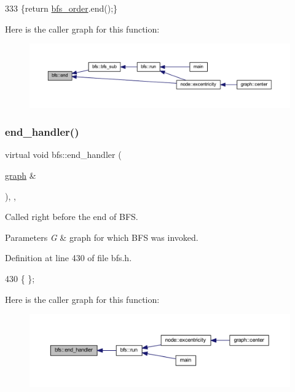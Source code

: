 \begin{DoxyCode}
333     \{\textcolor{keywordflow}{return} \mbox{\hyperlink{classbfs_a2596d2cf52f6e7922fd94ce1adde760e}{bfs\_order}}.end();\}
\end{DoxyCode}
Here is the caller graph for this function\+:
\nopagebreak
\begin{figure}[H]
\begin{center}
\leavevmode
\includegraphics[width=350pt]{classbfs_ac35b3d3c37d33eb80adb752e17a60df9_icgraph}
\end{center}
\end{figure}
\mbox{\label{classbfs_adbabb41ab56b92606fe7b53f346142ed}} 
\subsubsection{\texorpdfstring{end\+\_\+handler()}{end\_handler()}}
{\footnotesize\ttfamily virtual void bfs\+::end\+\_\+handler (\begin{DoxyParamCaption}\item[{\mbox{\hyperlink{classgraph}{graph}} \&}]{ }\end{DoxyParamCaption})\hspace{0.3cm}{\ttfamily [inline]}, {\ttfamily [virtual]}, {\ttfamily [inherited]}}



Called right before the end of B\+FS. 


\begin{DoxyParams}{Parameters}
{\em G} & graph for which B\+FS was invoked. \\
\hline
\end{DoxyParams}


Definition at line 430 of file bfs.\+h.


\begin{DoxyCode}
430 \{ \};
\end{DoxyCode}
Here is the caller graph for this function\+:
\nopagebreak
\begin{figure}[H]
\begin{center}
\leavevmode
\includegraphics[width=350pt]{classbfs_adbabb41ab56b92606fe7b53f346142ed_icgraph}
\end{center}
\end{figure}
\mbox{\label{classbfs_a3e1a7b0e4bde586d0be44616e533c59c}} 
